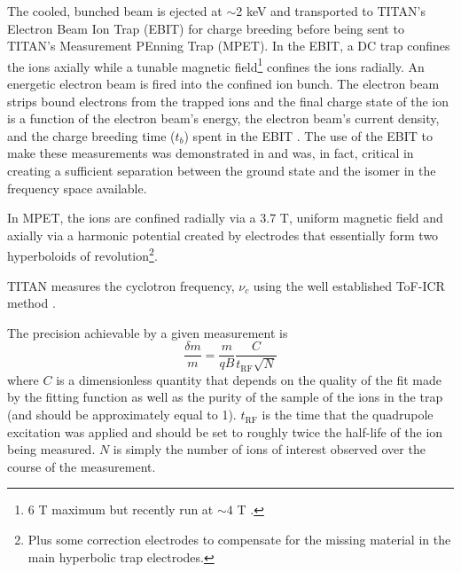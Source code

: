 \documentclass[12pt]{article}
\begin{document}
The cooled, bunched beam is ejected at $\sim$2 keV and transported to TITAN's Electron Beam Ion Trap (EBIT) for charge breeding before being sent to TITAN's Measurement PEnning Trap (MPET). In the EBIT, a DC trap confines the ions axially while a tunable magnetic field\footnote{6 T maximum but recently run at $\sim 4$ T \cite{Klawitter2015}.} confines the ions radially. An energetic electron beam is fired into the confined ion bunch. The electron beam strips bound electrons from the trapped ions and the final charge state of the ion is a function of the electron beam's energy, the electron beam's current density, and the charge breeding time ($t_b$) spent in the EBIT \cite{Froese2006}. The use of the EBIT to make these measurements was demonstrated in \cite{Lascar2017} and was, in fact, critical in creating a sufficient separation between the ground state and the isomer in the frequency space available.

In MPET, the ions are confined radially via a 3.7 T, uniform magnetic field and axially via a harmonic potential created by electrodes that essentially form two hyperboloids of revolution\footnote{Plus some correction electrodes to compensate for the missing material in the main hyperbolic trap electrodes.}. 


TITAN measures the cyclotron frequency, $\nu_c$ using the well established ToF-ICR method \cite{Brown1982b}.

The precision achievable by a given measurement is
\begin{equation}
\frac{\delta m}{m} = \frac{m}{qB}\frac{C}{t_{\mathrm{RF}}\sqrt{N}}
\label{eq:precision}
\end{equation}
where $C$ is a dimensionless quantity that depends on the quality of the fit made by the fitting function as well as the purity of the sample of the ions in the trap (and should be approximately equal to 1). $t_{\mathrm{RF}}$ is the time that the quadrupole excitation was applied and should be set to roughly twice the half-life of the ion being measured. $N$ is simply the number of ions of interest observed over the course of the measurement.
\end{document}
